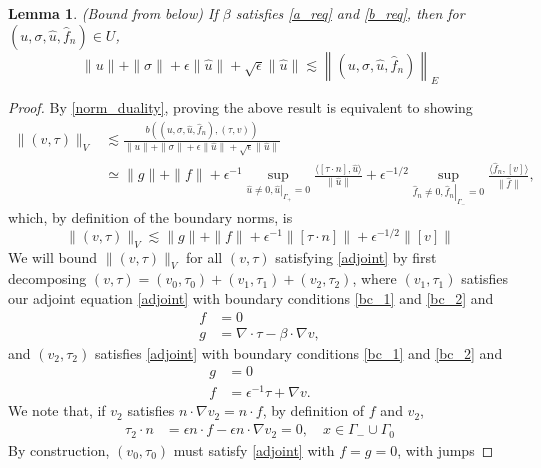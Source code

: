 \documentclass[11pt,onecolumn]{scrartcl}
\newcommand{\grad}{\nabla}
\renewcommand{\div}{\grad \cdot}
\newtheorem{lemma}{Lemma}
\begin{document}
\begin{lemma}
\label{bound_from_below}
(Bound from below) If $\beta$ satisfies \eqref{a_req} and \eqref{b_req}, then for $\left(u,\sigma,\widehat{u},\widehat{f}_n\right) \in U$,
\[
\|u\| + \|\sigma\| + \epsilon\|\widehat{u}\|+ \sqrt{\epsilon}\|\widehat{u}\| \lesssim \left\|\left(u,\sigma,\widehat{u},\widehat{f}_n\right)\right\|_E
\]
\end{lemma}
\begin{proof}
By \eqref{norm_duality}, proving the above result is equivalent to showing 
\begin{align*}
\|\left(v,\tau\right)\|_V &\lesssim \frac{b\left(\left(u,\sigma,\widehat{u},\widehat{f}_n\right),\left(\tau,v\right)\right)}{\|u\| + \|\sigma\| + \epsilon\|\widehat{u}\|+ \sqrt{\epsilon}\|\widehat{u}\|}\\
& \simeq \|g\| + \|f\| + \epsilon^{-1}\sup_{\widehat{u}\neq 0, \left.\widehat{u}\right|_{\Gamma_+} = 0} \frac{\langle [\tau\cdot n], \widehat{u}\rangle}{\|\widehat{u}\|} + \epsilon^{-1/2}\sup_{\widehat{f}_n\neq 0, \left.\widehat{f}_n\right|_{\Gamma_-}=0}\frac{\langle \widehat{f}_n, [v]\rangle}{\|\widehat{f}\|},
\end{align*}
which, by definition of the boundary norms, is 
\[
\|\left(v,\tau\right)\|_V \lesssim \|g\| + \|f\| + \epsilon^{-1}\|[\tau\cdot n]\| + \epsilon^{-1/2}\|[v]\|
\]
We will bound $\|\left(v,\tau\right)\|_V$ for all $\left(v,\tau\right)$ satisfying \eqref{adjoint} by first decomposing $\left(v,\tau\right) = \left(v_0,\tau_0\right) + \left(v_1,\tau_1\right) + \left(v_2,\tau_2\right)$, where $\left(v_1,\tau_1\right)$ satisfies our adjoint equation \eqref{adjoint} with boundary conditions \eqref{bc_1} and \eqref{bc_2} and 
\begin{align*}
f &= 0\\
g&= \div \tau - \beta\cdot \grad v,
\end{align*} 
and $\left(v_2,\tau_2\right)$ satisfies \eqref{adjoint} with boundary conditions \eqref{bc_1} and \eqref{bc_2} and 
\begin{align*}
g &= 0\\
f &= \epsilon^{-1}\tau + \grad v.
\end{align*}
We note that, if $v_2$ satisfies $n\cdot \grad v_2 = n\cdot f$, by definition of $f$ and $v_2$,
\begin{align*}
\tau_2 \cdot n &= \epsilon n\cdot f - \epsilon n\cdot \grad v_2 = 0, \quad x\in \Gamma_- \cup \Gamma_0
\end{align*}
By construction, $\left(v_0,\tau_0\right)$ must satisfy \eqref{adjoint} with $f=g=0$, with jumps

\end{proof}
\end{document}
